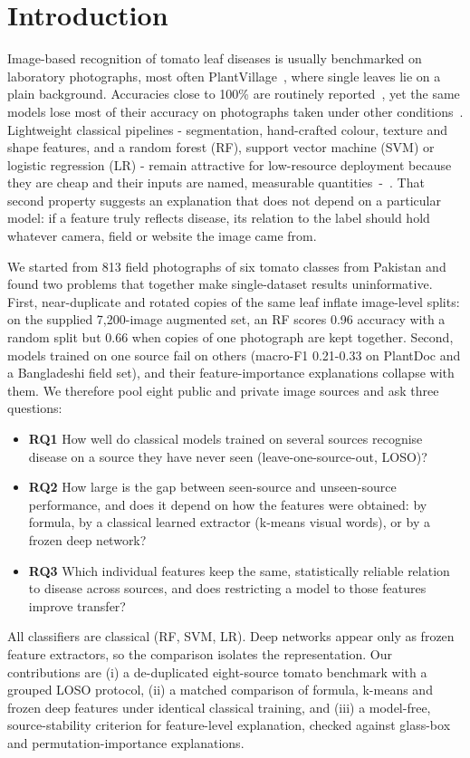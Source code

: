 \documentclass[conference]{IEEEtran}
\begin{document}
\section{Introduction}
Image-based recognition of tomato leaf diseases is usually benchmarked on laboratory photographs, most often PlantVillage~\cite{r1}, where single leaves lie on a plain background. Accuracies close to 100\% are routinely reported~\cite{r2,r3}, yet the same models lose most of their accuracy on photographs taken under other conditions~\cite{r2,r3,r5}. Lightweight classical pipelines - segmentation, hand-crafted colour, texture and shape features, and a random forest (RF), support vector machine (SVM) or logistic regression (LR) - remain attractive for low-resource deployment because they are cheap and their inputs are named, measurable quantities~\cite{r13,r18}-~\cite{r21}. That second property suggests an explanation that does not depend on a particular model: if a feature truly reflects disease, its relation to the label should hold whatever camera, field or website the image came from.

We started from 813 field photographs of six tomato classes from Pakistan and found two problems that together make single-dataset results uninformative. First, near-duplicate and rotated copies of the same leaf inflate image-level splits: on the supplied 7,200-image augmented set, an RF scores 0.96 accuracy with a random split but 0.66 when copies of one photograph are kept together. Second, models trained on one source fail on others (macro-F1 0.21-0.33 on PlantDoc and a Bangladeshi field set), and their feature-importance explanations collapse with them. We therefore pool eight public and private image sources and ask three questions:

\begin{itemize}\item \textbf{RQ1} How well do classical models trained on several sources recognise disease on a source they have never seen (leave-one-source-out, LOSO)?\item \textbf{RQ2} How large is the gap between seen-source and unseen-source performance, and does it depend on how the features were obtained: by formula, by a classical learned extractor (k-means visual words), or by a frozen deep network?\item \textbf{RQ3} Which individual features keep the same, statistically reliable relation to disease across sources, and does restricting a model to those features improve transfer?\end{itemize}
All classifiers are classical (RF, SVM, LR). Deep networks appear only as frozen feature extractors, so the comparison isolates the representation. Our contributions are (i) a de-duplicated eight-source tomato benchmark with a grouped LOSO protocol, (ii) a matched comparison of formula, k-means and frozen deep features under identical classical training, and (iii) a model-free, source-stability criterion for feature-level explanation, checked against glass-box and permutation-importance explanations.
\end{document}
